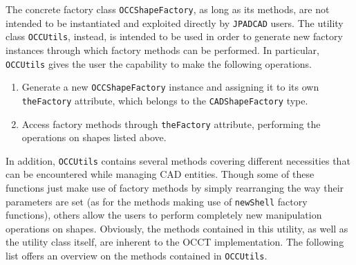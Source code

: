 \bigskip
\noindent
The concrete factory class \lstinline[language=Java]!OCCShapeFactory!, as long as its methods, are not intended to be instantiated and exploited directly by \lstinline[language=Java]!JPADCAD! users. The utility class \lstinline[language=Java]!OCCUtils!, instead, is intended to be used in order to generate new factory instances through which factory methods can be performed. In particular, \lstinline[language=Java]!OCCUtils! gives the user the capability to make the following operations.
%
\begin{enumerate}
\item Generate a new \lstinline[language=Java]!OCCShapeFactory! instance and assigning it to its own \lstinline[language=Java]!theFactory! attribute, which belongs to the \lstinline[language=Java]!CADShapeFactory! type.
\item Access factory methods through \lstinline[language=Java]!theFactory! attribute, performing the operations on shapes listed above.
\end{enumerate}
%
In addition, \lstinline[language=Java]!OCCUtils! contains several methods covering different necessities that can be encountered while managing \gls{CAD} entities. Though some of these functions just make use of factory methods by simply rearranging the way their parameters are set (as for the methods making use of \lstinline[language=Java]!newShell! factory functions), others allow the users to perform completely new manipulation operations on shapes. Obviously, the methods contained in this utility, as well as the utility class itself, are inherent to the \gls{OCCT} implementation. The following list offers an overview on the methods contained in \lstinline[language=Java]!OCCUtils!.
%
